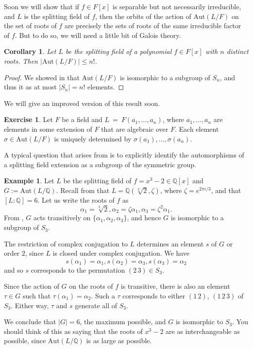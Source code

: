 \documentclass[12pt]{report}
\newtheorem{corollary}[theorem]{Corollary}
\numberwithin{equation}{section}
\numberwithin{theorem}{chapter}
\theoremstyle{definition}
\newtheorem{example}[theorem]{Example}
\newtheorem{exercise}{Exercise}
\newtheorem*{basic properties}{Basic Properties}
\newtheorem*{Important Remark}{Important Remark}
\begin{document}
Soon we will show that if $f \in F[x]$ is separable but not necessarily irreducible, and $L$ is the splitting field of $f$, then the orbits of the action of $\mathrm{Aut}(L/F)$ on the set of roots of $f$ are precisely the sets of roots of the same irreducible factor of $f$. But to do so, we will need a little bit of Galois theory.

\begin{corollary}
Let $L$ be the splitting field of a polynomial $f \in F[x]$ with $n$ distinct roots. Then $|\mathrm{Aut}(L/F)| \leqslant n!$.
\end{corollary}

\begin{proof}
	We showed in  that $\mathrm{Aut}(L/F)$ is isomorphic to a subgroup of $S_n$, and thus it as at most $|S_n| = n!$ elements.
\end{proof}

We will give an improved version of this result soon.


\begin{exercise}\label{aut elements determined by image of gens}
Let $F$ be a field and $L~=~F(a_1, \ldots, a_n)$, where $a_1,\ldots, a_n$ are elements in some extension of $F$ that are algebraic over $F$. Each element $\sigma \in \mathrm{Aut}(L/F)$ is uniquely determined by $\sigma(a_1),\ldots, \sigma(a_n)$.
\end{exercise}

A typical question that arises from  is to explicitly identify the automorphisms of a splitting field extension as a subgroup of the symmetric group.

\begin{example} 
Let $L$ be the splitting field of $f = x^3-2 \in \mathbb{Q}[x]$ and $G := \mathrm{Aut}(L/\mathbb{Q})$. Recall from  that $L = \mathbb{Q}(\sqrt[3]{2}, \zeta)$, where $\zeta = e^{2 \pi i/3}$, and that $[L:\mathbb{Q}] = 6$.
Let us write the roots of $f$ as 
$$\alpha_1 = \sqrt[3]{2}, \alpha_2 = \zeta \alpha_1, \alpha_3 = \zeta^2 \alpha_1.$$
From , $G$ acts transitively on $\{\alpha_1, \alpha_2, \alpha_3\}$, and hence $G$ is isomorphic to a subgroup of $S_3$.

The restriction of complex conjugation to $L$ determines an element $s$ of $G$ or order $2$, since $L$ is closed under complex conjugation. We have 
$$s(\alpha_1) = \alpha_1, s(\alpha_2) = \alpha_3, s(\alpha_3) = \alpha_2$$
and so $s$ corresponds to the permutation $(2 \, 3) \in S_3$.

Since the action of $G$ on the roots of $f$ is transitive, there is also an element $\tau \in G$ such that $\tau(\alpha_1) = \alpha_2$. Such a $\tau$ corresponds to either $(1 \, 2)$, $(1 \, 2 \, 3)$ of $S_3$. Either way, $\tau$ and $s$ generate all of $S_3$.

We conclude that $|G| = 6$, the maximum possible, and $G$ is isomorphic to $S_3$. You should think of this as saying that the roots of $x^3 -2$ are as interchangeable as possible, since $\mathrm{Aut}(L/\mathbb{Q})$ is as large as possible. 
\end{example}
\end{document}
